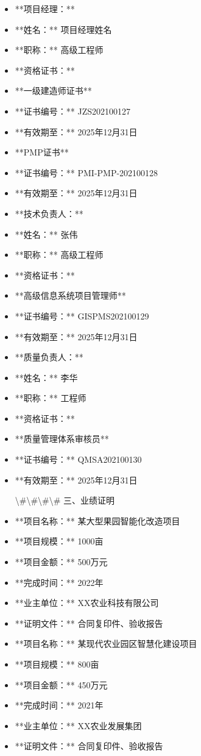 \documentclass[UTF8,a4paper,zihao=-4]{ctexart}
\begin{document}
\begin{itemize}
\item **项目经理：**
\item **姓名：** {{项目经理姓名}}
\item **职称：** 高级工程师
\item **资格证书：**
\item **一级建造师证书**
\item **证书编号：** JZS202100127
\item **有效期至：** 2025年12月31日
\item **PMP证书**
\item **证书编号：** PMI-PMP-202100128
\item **有效期至：** 2025年12月31日
\item **技术负责人：**
\item **姓名：** 张伟
\item **职称：** 高级工程师
\item **资格证书：**
\item **高级信息系统项目管理师**
\item **证书编号：** GISPMS202100129
\item **有效期至：** 2025年12月31日
\item **质量负责人：**
\item **姓名：** 李华
\item **职称：** 工程师
\item **资格证书：**
\item **质量管理体系审核员**
\item **证书编号：** QMSA202100130
\item **有效期至：** 2025年12月31日

\textbackslash{}#\textbackslash{}#\textbackslash{}#\textbackslash{}# 三、业绩证明

\item **项目名称：** 某大型果园智能化改造项目
\item **项目规模：** 1000亩
\item **项目金额：** 500万元
\item **完成时间：** 2022年
\item **业主单位：** XX农业科技有限公司
\item **证明文件：** 合同复印件、验收报告
\item **项目名称：** 某现代农业园区智慧化建设项目
\item **项目规模：** 800亩
\item **项目金额：** 450万元
\item **完成时间：** 2021年
\item **业主单位：** XX农业发展集团
\item **证明文件：** 合同复印件、验收报告


\end{itemize}
\end{document}
